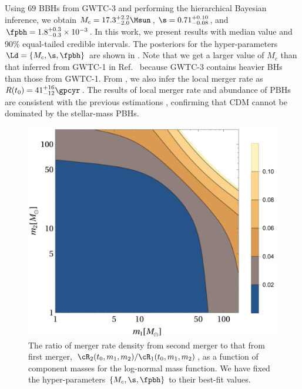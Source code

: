 \documentclass[
reprint,           %
superscriptaddress,%
amsmath,           %
amssymb,           %
aps,               %
prd,               %
notitlepage,       %
longbibliography,  %
floatfix,          %
nofootinbib,
]{revtex4-1}
\begin{document}
Using $69$ BBHs from GWTC-3 and performing the hierarchical Bayesian inference, we obtain $M_c = 17.3^{+2.2}_{-2.0} \Msun$, $\s = 0.71^{+0.10}_{-0.08}$, and $\fpbh = 1.8^{+0.3}_{-0.3} \times 10^{-3}$. In this work, we present results with median value and 90\% equal-tailed credible intervals. The posteriors for the hyper-parameters $\Ld = \{M_c, \s, \fpbh\}$ are shown in . Note that we get a larger value of $M_c$ than that inferred from GWTC-1 in Ref.~\cite{Wu:2020drm} because GWTC-3 contains heavier BHs than those from GWTC-1. From , we also infer the local merger rate as $R(t_0) = 41^{+16}_{-12} \gpcyr$. The results of local merger rate and abundance of PBHs are consistent with the previous estimations \cite{Sasaki:2016jop,Ali-Haimoud:2017rtz,Chen:2018czv,Chen:2018rzo,Chen:2019irf,Wu:2020drm,Chen:2021nxo,Chen:2022fda}, confirming that CDM cannot be dominated by the stellar-mass PBHs.

\begin{figure}[tbp!]
	\centering
	\includegraphics[width=\linewidth]{ratio-log.pdf}
	\caption{\label{ratio-log}The ratio of merger rate density from second merger to that from first merger, $\cR_2(t_0, m_1, m_2)/\cR_1(t_0, m_1, m_2)$, as a function of component masses for the log-normal mass function. We have fixed the hyper-parameters $\{M_c, \s, \fpbh\}$ to their best-fit values.}
\end{figure}
\end{document}
